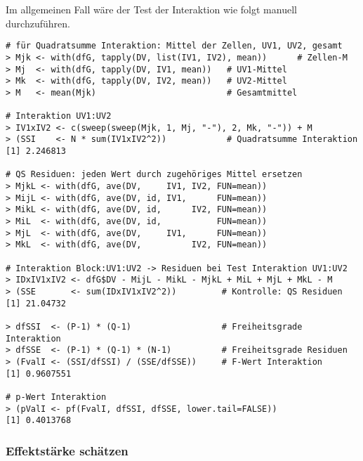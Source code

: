 Im allgemeinen Fall wäre der Test der Interaktion wie folgt manuell durchzuführen.
\begin{lstlisting}
# für Quadratsumme Interaktion: Mittel der Zellen, UV1, UV2, gesamt
> Mjk <- with(dfG, tapply(DV, list(IV1, IV2), mean))      # Zellen-M
> Mj  <- with(dfG, tapply(DV, IV1, mean))   # UV1-Mittel
> Mk  <- with(dfG, tapply(DV, IV2, mean))   # UV2-Mittel
> M   <- mean(Mjk)                          # Gesamtmittel

# Interaktion UV1:UV2
> IV1xIV2 <- c(sweep(sweep(Mjk, 1, Mj, "-"), 2, Mk, "-")) + M
> (SSI    <- N * sum(IV1xIV2^2))            # Quadratsumme Interaktion
[1] 2.246813

# QS Residuen: jeden Wert durch zugehöriges Mittel ersetzen
> MjkL <- with(dfG, ave(DV,     IV1, IV2, FUN=mean))
> MijL <- with(dfG, ave(DV, id, IV1,      FUN=mean))
> MikL <- with(dfG, ave(DV, id,      IV2, FUN=mean))
> MiL  <- with(dfG, ave(DV, id,           FUN=mean))
> MjL  <- with(dfG, ave(DV,     IV1,      FUN=mean))
> MkL  <- with(dfG, ave(DV,          IV2, FUN=mean))

# Interaktion Block:UV1:UV2 -> Residuen bei Test Interaktion UV1:UV2
> IDxIV1xIV2 <- dfG$DV - MijL - MikL - MjkL + MiL + MjL + MkL - M
> (SSE       <- sum(IDxIV1xIV2^2))         # Kontrolle: QS Residuen
[1] 21.04732

> dfSSI  <- (P-1) * (Q-1)                  # Freiheitsgrade Interaktion
> dfSSE  <- (P-1) * (Q-1) * (N-1)          # Freiheitsgrade Residuen
> (FvalI <- (SSI/dfSSI) / (SSE/dfSSE))     # F-Wert Interaktion
[1] 0.9607551

# p-Wert Interaktion
> (pValI <- pf(FvalI, dfSSI, dfSSE, lower.tail=FALSE))
[1] 0.4013768
\end{lstlisting}

\subsubsection{Effektstärke schätzen}

